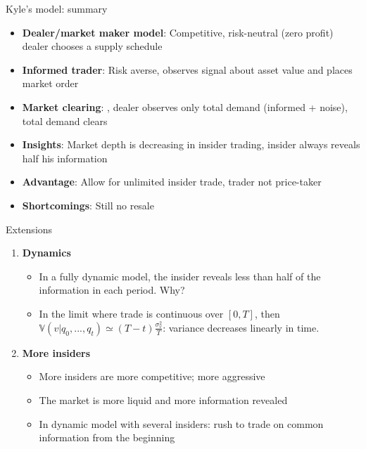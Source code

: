 \documentclass[english,10pt]{beamer}
\begin{document}
\begin{frame}{Kyle's model: summary}
	\begin{itemize}
		\item \textbf{Dealer/market maker model}: Competitive, risk-neutral (zero profit) dealer chooses a supply schedule
		\item \textbf{Informed trader}: Risk averse, observes signal about asset value and places market order
		\item \textbf{Market clearing}: , dealer observes only total demand (informed + noise), total demand clears
		\item \textbf{Insights}: Market depth is decreasing in insider trading, insider always reveals half his information
		\item \textbf{Advantage}: Allow for unlimited insider trade, trader not price-taker
		\item \textbf{Shortcomings}: Still no resale
	\end{itemize}
\end{frame}


\begin{frame}{Extensions}
	\begin{enumerate}
		\item \textbf{Dynamics}
		\begin{itemize}
			\item In a fully dynamic model, the insider reveals less than half of the information in each period. Why?
			\pause {}
			\pause
			\item In the limit where trade is continuous over $[0,T]$, then $\mathbb{V}(v|q_0, ..., q_t) \simeq (T-t)\frac{\sigma^2_v}{T}$: variance decreases linearly in time. 
			\pause {}
		\end{itemize}
		\pause
		\item \textbf{More insiders}
		\begin{itemize}
			\item More insiders are more competitive; more aggressive
			\item The market is more liquid and more information revealed
			\item In dynamic model with several insiders: rush to trade on common information from the beginning
		\end{itemize}
	\end{enumerate}
\end{frame}
\end{document}
